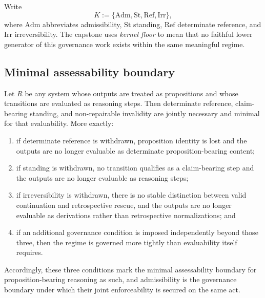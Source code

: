 \begin{definition}
Write
\[
K := \{\mathrm{Adm},\mathrm{St},\mathrm{Ref},\mathrm{Irr}\},
\]
where $\mathrm{Adm}$ abbreviates admissibility, $\mathrm{St}$ standing, $\mathrm{Ref}$ determinate reference, and $\mathrm{Irr}$ irreversibility. The capstone uses \emph{kernel floor} to mean that no faithful lower generator of this governance work exists within the same meaningful regime.
\end{definition}

\subsection{Minimal assessability boundary}

\begin{theorem}
\label{thm:minimal-assessability-boundary}
Let $R$ be any system whose outputs are treated as propositions and whose transitions are evaluated as reasoning steps. Then determinate reference, claim-bearing standing, and non-repairable invalidity are jointly necessary and minimal for that evaluability. More exactly:
\begin{enumerate}
  \item if determinate reference is withdrawn, proposition identity is lost and the outputs are no longer evaluable as determinate proposition-bearing content;
  \item if standing is withdrawn, no transition qualifies as a claim-bearing step and the outputs are no longer evaluable as reasoning steps;
  \item if irreversibility is withdrawn, there is no stable distinction between valid continuation and retrospective rescue, and the outputs are no longer evaluable as derivations rather than retrospective normalizations; and
  \item if an additional governance condition is imposed independently beyond those three, then the regime is governed more tightly than evaluability itself requires.
\end{enumerate}
Accordingly, these three conditions mark the minimal assessability boundary for proposition-bearing reasoning as such, and admissibility is the governance boundary under which their joint enforceability is secured on the same act.
\end{theorem}

